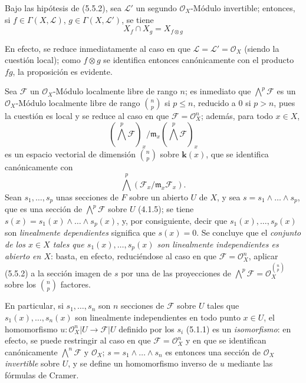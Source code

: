 \begin{env}[5.5.3]
\label{0.5.5.3-fr}
Bajo las hipótesis de (5.5.2), sea $\mathcal{L}'$ un segundo
$\mathcal{O}_X$-Módulo invertible; entonces, si
$f\in\Gamma(X,\mathcal{L})$, $g\in\Gamma(X,\mathcal{L}')$, se tiene
\[
  X_f\cap X_g=X_{f\otimes g}
\]

En efecto, se reduce inmediatamente al caso en que
$\mathcal{L}=\mathcal{L}'=\mathcal{O}_X$ (siendo la cuestión local); como
$f\otimes g$ se identifica entonces canónicamente con el producto $fg$, la proposición
es evidente.
\end{env}


\begin{env}[5.5.4]
\label{0.5.5.4-fr}
Sea $\mathcal{F}$ un $\mathcal{O}_X$-Módulo localmente libre de rango $n$;
es inmediato que $\bigwedge^p\mathcal{F}$ es un $\mathcal{O}_X$-Módulo
localmente libre de rango $\binom{n}{p}$ si $p\leq n$, reducido a $0$ si $p>n$,
pues la cuestión es local y se reduce al caso en que
$\mathcal{F}=\mathcal{O}_X^n$; además, para todo $x\in X$,
\[
  (\bigwedge^p\mathcal{F})_x/
  \mathfrak{m}_x(\bigwedge^p\mathcal{F})_x
\]
es un espacio vectorial de dimensión $\binom{n}{p}$ sobre $\boldsymbol{k}(x)$, que
se identifica canónicamente con
\[
  \bigwedge^p(\mathcal{F}_x/\mathfrak{m}_x\mathcal{F}_x).
\]
Sean
$s_1,\ldots,s_p$ unas secciones de $F$ sobre un abierto $U$ de $X$, y
sea $s=s_1\wedge\ldots\wedge s_p$, que es una sección de
$\bigwedge^p\mathcal{F}$ sobre $U$ (4.1.5); se tiene
$s(x)=s_1(x)\wedge\ldots\wedge s_p(x)$, y, por consiguiente, decir que
$s_1(x),\ldots,s_p(x)$ son \emph{linealmente dependientes} significa que
$s(x)=0$. Se concluye que el \emph{conjunto de los $x\in X$ tales que
$s_1(x),\ldots,s_p(x)$ son linealmente independientes es abierto en
$X$}: basta, en efecto, reduciéndose al caso en que
$\mathcal{F}=\mathcal{O}_X^n$, aplicar (5.5.2) a la sección imagen de $s$
por una de las proyecciones de
$\bigwedge^p\mathcal{F}=\mathcal{O}_X^{\binom{n}{p}}$ sobre los
$\binom{n}{p}$ factores.

En particular, si $s_1,\ldots,s_n$ son $n$ secciones de $\mathcal{F}$
sobre $U$ tales que $s_1(x),\ldots,s_n(x)$ son linealmente
independientes en todo punto $x\in U$, el homomorfismo
$u:\mathcal{O}_X^n|U\to\mathcal{F}|U$ definido por los $s_i$ (5.1.1) es un
\emph{isomorfismo}: en efecto, se puede restringir al caso en que
$\mathcal{F}=\mathcal{O}_X^n$ y en que se identifican canónicamente
$\bigwedge^n\mathcal{F}$ y $\mathcal{O}_X$;
$s=s_1\wedge\ldots\wedge s_n$ es entonces una sección de $\mathcal{O}_X$
\emph{invertible} sobre $U$, y se define un homomorfismo inverso
de $u$ mediante las fórmulas de Cramer.
\end{env}

